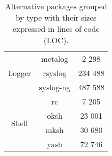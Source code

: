 \begin{table}[!ht]
\begin{tabular}{|c|c|c|}
        \hline
        \hline
        \multirow{3}{*}{Logger}
        & metalog \cite{metalog} & 2 298 \\
        \cline{2-3}
        & rsyslog \cite{rsyslog} & 234 488 \\
        \cline{2-3}
        & syslog-ng \cite{syslog-ng} & 487 588 \\
        \hline
        \hline
        \multirow{4}{*}{Shell}
        & rc \cite{rc} & 7 205 \\
        \cline{2-3}
        & oksh \cite{oksh} & 23 001 \\
        \cline{2-3}
        & mksh \cite{mksh} & 30 680 \\
        \cline{2-3}
        & yash \cite{yash} & 72 746 \\
        \hline
    \end{tabular}
    \caption{Alternative packages grouped by type with their sizes expressed in lines of code (LOC).}
\end{table}


\newpage

